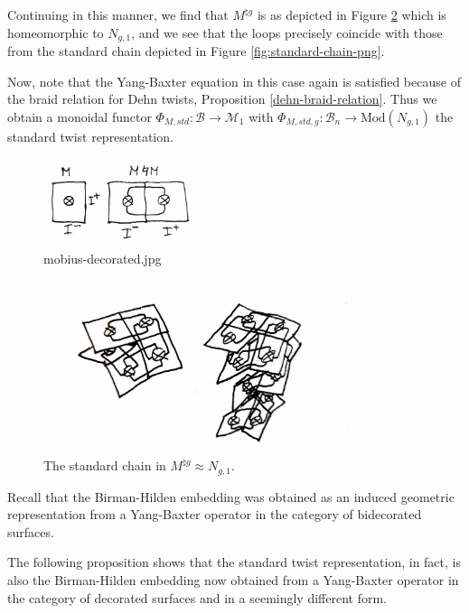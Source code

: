 \documentclass[reqno]{amsart}
\theoremstyle{definition}
\theoremstyle{remark}
\newcommand{\Mod}{{\mathrm{Mod}}}
\begin{document}
Continuing in this manner, we find that
$M^{\natural g}$ is as depicted in
Figure \ref{fig:Ng1-jpg} which is homeomorphic to
$N_{g,1}$, and we see that the loops precisely coincide with
those from the standard chain depicted in
Figure \ref{fig:standard-chain-png}.

Now, note that the Yang-Baxter equation in this case
again is satisfied because of the
braid relation for Dehn twists,
Proposition \ref{dehn-braid-relation}. Thus
we obtain a monoidal functor
$\Phi_{M, std} \colon \mathcal{B} \to 
\mathcal{M}_1$ with
$\Phi_{M, std, g} \colon \mathcal{B}_n
\to \Mod \left( N_{g,1} \right) $ the standard twist representation.

\begin{figure}[H]
    \centering
    \includegraphics[width=0.4\textwidth]{mobius-decorated.jpg}
    \caption{mobius-decorated.jpg}
    \label{fig:mobius-decorated-jpg}
\end{figure}

\begin{figure}[H]
    \centering
    \includegraphics[width=0.8\textwidth]{Ng1.jpg}
    \caption{The standard chain in
    $M^{\natural g} \approx N_{g,1}$.}
    \label{fig:Ng1-jpg}
\end{figure}



Recall that the Birman-Hilden embedding was obtained
as an induced geometric representation from a Yang-Baxter
operator in the category of bidecorated surfaces.

The following proposition shows that 
the standard twist representation, in fact, 
is also the Birman-Hilden embedding now obtained
from a Yang-Baxter operator in the category of
decorated surfaces and in a seemingly different form.
\end{document}

